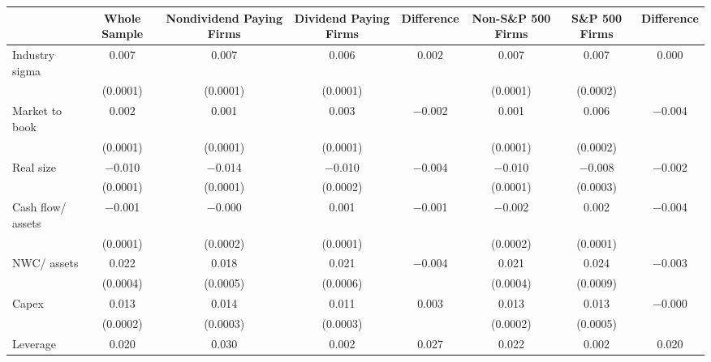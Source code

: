 \begin{tabular}{l*{7}{c}}
\toprule
                    &\multicolumn{1}{p{2cm}}{\centering Whole Sample}&\multicolumn{1}{p{2cm}}{\centering Nondividend Paying Firms}&\multicolumn{1}{p{2cm}}{\centering Dividend Paying Firms}&\multicolumn{1}{p{2cm}}{\centering Difference}&\multicolumn{1}{p{2cm}}{\centering Non-S\&P 500 Firms}&\multicolumn{1}{p{2cm}}{\centering S\&P 500 Firms}&\multicolumn{1}{p{2cm}}{\centering Difference}\\
\midrule
Industry sigma      &       0.007&       0.007&       0.006&       0.002&       0.007&       0.007&       0.000\\
                    &    (0.0001)&    (0.0001)&    (0.0001)&            &    (0.0001)&    (0.0002)&            \\
\addlinespace
Market to book      &       0.002&       0.001&       0.003&    $-$0.002&       0.001&       0.006&    $-$0.004\\
                    &    (0.0001)&    (0.0001)&    (0.0001)&            &    (0.0001)&    (0.0002)&            \\
\addlinespace
Real size           &    $-$0.010&    $-$0.014&    $-$0.010&    $-$0.004&    $-$0.010&    $-$0.008&    $-$0.002\\
                    &    (0.0001)&    (0.0001)&    (0.0002)&            &    (0.0001)&    (0.0003)&            \\
\addlinespace
Cash flow/ assets   &    $-$0.001&    $-$0.000&       0.001&    $-$0.001&    $-$0.002&       0.002&    $-$0.004\\
                    &    (0.0001)&    (0.0002)&    (0.0001)&            &    (0.0002)&    (0.0001)&            \\
\addlinespace
NWC/ assets         &       0.022&       0.018&       0.021&    $-$0.004&       0.021&       0.024&    $-$0.003\\
                    &    (0.0004)&    (0.0005)&    (0.0006)&            &    (0.0004)&    (0.0009)&            \\
\addlinespace
Capex               &       0.013&       0.014&       0.011&       0.003&       0.013&       0.013&    $-$0.000\\
                    &    (0.0002)&    (0.0003)&    (0.0003)&            &    (0.0002)&    (0.0005)&            \\
\addlinespace
Leverage            &       0.020&       0.030&       0.002&       0.027&       0.022&       0.002&       0.020\\

\end{tabular}
